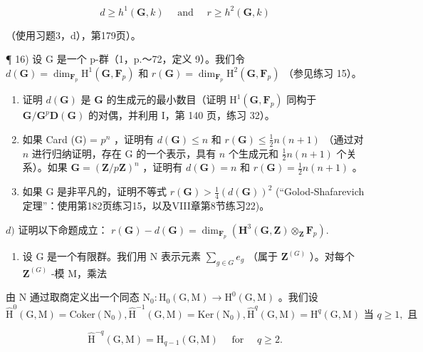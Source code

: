 \[
d \geqslant h ^ {1} (\mathbf {G}, k) \quad \text { and } \quad r \geqslant h ^ {2} (\mathbf {G}, k)
\]

（使用习题3，d），第179页）。

¶ 16) 设 G 是一个 p-群（1，p.～72，定义 9）。我们令 \(d(\mathbf{G}) = \dim_{\mathbf{F}_{p}} \mathrm{H}^{1}(\mathbf{G}, \mathbf{F}_{p})\) 和 \(r(\mathbf{G}) = \dim_{\mathbf{F}_{p}} \mathrm{H}^{2}(\mathbf{G}, \mathbf{F}_{p})\) （参见练习 15）。

\begin{enumerate}
\def\labelenumi{\alph{enumi})}
\item
  证明 \(d(\mathbf{G})\) 是 \(\mathbf{G}\) 的生成元的最小数目（证明 \(\mathrm{H}^1 (\mathbf{G},\mathbf{F}_p)\) 同构于 \(\mathbf{G} / \mathbf{G}^p\mathbf{D}(\mathbf{G})\) 的对偶，并利用 I，第 140 页，练习 32）。
\item
  如果 Card (G) = \(p^n\) ，证明有 \(d(\mathbf{G}) \leqslant n\) 和 \(r(\mathbf{G}) \leqslant \frac{1}{2} n(n + 1)\) （通过对 \(n\) 进行归纳证明，存在 G 的一个表示，具有 \(n\) 个生成元和 \(\frac{1}{2} n(n + 1)\) 个关系）。如果 \(\mathbf{G} = (\mathbf{Z}/p\mathbf{Z})^n\) ，证明有 \(d(\mathbf{G}) = n\) 和 \(r(\mathbf{G}) = \frac{1}{2} n(n + 1)\) 。
\item
  如果 G 是非平凡的，证明不等式 \(r(\mathbf{G}) > \frac{1}{4}(d(\mathbf{G}))^{2}\) (“Golod-Shafarevich定理”：使用第182页练习15，以及VIII章第8节练习22)。
\end{enumerate}

\(d)\) 证明以下命题成立： \(r(\mathbf{G}) - d(\mathbf{G}) = \dim_{\mathbf{F}_p}(\mathbf{H}^3 (\mathbf{G},\mathbf{Z})\otimes_{\mathbf{Z}}\mathbf{F}_p).\)

\begin{enumerate}
\def\labelenumi{\arabic{enumi})}
\setcounter{enumi}{16}
\tightlist
\item
  设 G 是一个有限群。我们用 N 表示元素 \(\sum_{g\in G}e_g\) （属于 \(\mathbf{Z}^{(G)}\) ）。对每个 \(\mathbf{Z}^{(G)}\) -模 M，乘法
\end{enumerate}

由 N 通过取商定义出一个同态 \(\mathrm{N}_{0}:\mathrm{H}_{0}(\mathrm{G},\mathrm{M})\to\mathrm{H}^{0}(\mathrm{G},\mathrm{M})\) 。我们设 \(\hat{\mathrm{H}}^{0}(\mathrm{G},\mathrm{M})=\mathrm{Coker}(\mathrm{N}_{0}),\hat{\mathrm{H}}^{-1}(\mathrm{G},\mathrm{M})=\mathrm{Ker}(\mathrm{N}_{0}),\hat{\mathrm{H}}^{q}(\mathrm{G},\mathrm{M})=\mathrm{H}^{q}(\mathrm{G},\mathrm{M})\text{ 当 } q\geqslant1,\text{ 且}\)

\[
\hat {\mathrm{H}} ^ {- q} (\mathrm{G}, \mathrm{M}) = \mathrm{H} _ {q - 1} (\mathrm{G}, \mathrm{M}) \quad \text { for } \quad q \geqslant 2.
\]

